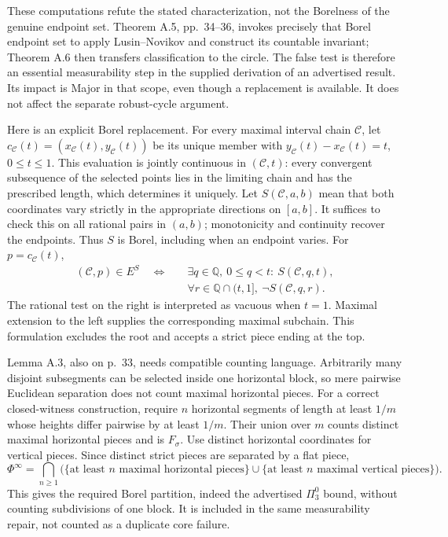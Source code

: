 \documentclass[10pt]{article}
\begin{document}
These computations refute the stated characterization, not the Borelness of the genuine endpoint set. Theorem A.5, pp. 34–36, invokes precisely that Borel endpoint set to apply Lusin–Novikov and construct its countable invariant; Theorem A.6 then transfers classification to the circle. The false test is therefore an essential measurability step in the supplied derivation of an advertised result. Its impact is Major in that scope, even though a replacement is available. It does not affect the separate robust-cycle argument.\par
Here is an explicit Borel replacement. For every maximal interval chain \(\mathcal C\), let \(c_\mathcal C(t)=(x_\mathcal C(t),y_\mathcal C(t))\) be its unique member with \(y_\mathcal C(t)-x_\mathcal C(t)=t\), \(0\leq t\leq1\). This evaluation is jointly continuous in \((\mathcal C,t)\): every convergent subsequence of the selected points lies in the limiting chain and has the prescribed length, which determines it uniquely. Let \(S(\mathcal C,a,b)\) mean that both coordinates vary strictly in the appropriate directions on \([a,b]\). It suffices to check this on all rational pairs in \((a,b)\); monotonicity and continuity recover the endpoints. Thus \(S\) is Borel, including when an endpoint varies. For \(p=c_\mathcal C(t)\), \[\begin{aligned}
(\mathcal C,p)\in E^S\quad\Longleftrightarrow\quad&
\exists q\in\mathbb Q,\ 0\leq q<t:\ S(\mathcal C,q,t),\\
&\forall r\in\mathbb Q\cap(t,1],\ \neg S(\mathcal C,q,r).
\end{aligned}\] The rational test on the right is interpreted as vacuous when \(t=1\). Maximal extension to the left supplies the corresponding maximal subchain. This formulation excludes the root and accepts a strict piece ending at the top.\par
Lemma A.3, also on p. 33, needs compatible counting language. Arbitrarily many disjoint subsegments can be selected inside one horizontal block, so mere pairwise Euclidean separation does not count maximal horizontal pieces. For a correct closed-witness construction, require \(n\) horizontal segments of length at least \(1/m\) whose heights differ pairwise by at least \(1/m\). Their union over \(m\) counts distinct maximal horizontal pieces and is \(F_\sigma\). Use distinct horizontal coordinates for vertical pieces. Since distinct strict pieces are separated by a flat piece, \[\Phi^\infty=\bigcap_{n\geq1}
   \bigl(\{\text{at least }n\text{ maximal horizontal pieces}\}
       \cup\{\text{at least }n\text{ maximal vertical pieces}\}\bigr).\] This gives the required Borel partition, indeed the advertised \(\Pi^0_3\) bound, without counting subdivisions of one block. It is included in the same measurability repair, not counted as a duplicate core failure.\par
\end{document}

